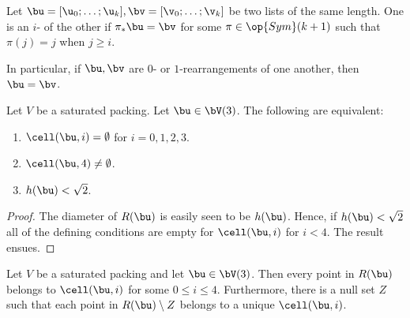 \bigskip

\begin{definition}[$i$-rearrangement] 
   Let
  $\bu=[\u_0;\ldots;\u_k],\bv=[\v_0;\ldots;\v_k]$ be two lists of the
  same length.  One is an $i$- of the other if
  $\pi_*\bu = \bv$ for some $\pi\in\op{Sym}(k+1)$ such that $\pi(j) =
  j$ when $j \ge i$.
\end{definition}

In particular, if $\bu,\bv$ are $0$- or $1$-rearrangements of one
another, then $\bu = \bv$.


\begin{lemma}[]\label{lemma:M-complement4} 
Let $V$ be a saturated packing.  Let $\bu\in \bV(3)$.
The following  are equivalent:
\begin{enumerate} 
\item  $\cell(\bu,i)=\emptyset$ for $i=0,1,2,3$.
\item  $\cell(\bu,4)\ne\emptyset$.
\item  $h(\bu)<\sqrt2$.
\end{enumerate}
\end{lemma}

\begin{proof} 
  The diameter of $R(\bu)$ is easily seen to be $h(\bu)$.  Hence, if
  $h(\bu)<\sqrt2$ all of the defining conditions are empty for
  $\cell(\bu,i)$ for $i<4$.  The result ensues.
\end{proof}

\begin{lemma}[]\label{lemma:M-exhaust} 
  Let $V$ be a saturated packing and let $\bu\in \bV(3)$. Then
  every point in $R(\bu)$ belongs to $\cell(\bu,i)$ for some $0\le
  i\le 4$.  Furthermore, there is a null set $Z$ such that each point
  in $R(\bu)\setminus Z$ belongs to a unique $\cell(\bu,i)$.
\end{lemma}

